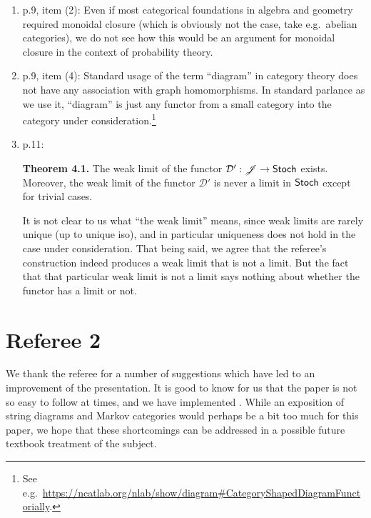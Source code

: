 \documentclass[11pt]{article}
\begin{document}
\begin{enumerate}[resume,label=(\alph*).]
	\item p.9, item (2): Even if most categorical foundations in algebra and geometry required monoidal closure (which is obviously not the case, take e.g.~abelian categories), we do not see how this would be an argument for monoidal closure in the context of probability theory.
	\item p.9, item (4): Standard usage of the term ``diagram'' in category theory does not have any association with graph homomorphisms. In standard parlance as we use it, ``diagram'' is just any functor from a small category into the category under consideration.\footnote{See e.g.~\href{https://ncatlab.org/nlab/show/diagram\#CategoryShapedDiagramFunctorially}{https://ncatlab.org/nlab/show/diagram\#CategoryShapedDiagramFunctorially}.}
	\item p.11:
		\begin{displayquote}
			\textbf{Theorem 4.1.} The weak limit of the functor $\mathcal{D}' : \mathscr{J} \to \operatorname{\mathsf{Stoch}}$ exists. Moreover, the weak limit of the functor $\mathcal{D}'$ is never a limit in $\operatorname{\mathsf{Stoch}}$ except for trivial cases.
		\end{displayquote}
		It is not clear to us what ``the weak limit'' means, since weak limits are rarely unique (up to unique iso), and in particular uniqueness does not hold in the case under consideration. That being said, we agree that the referee's construction indeed produces a weak limit that is not a limit. But the fact that that particular weak limit is not a limit says nothing about whether the functor has a limit or not.
\end{enumerate}

\section*{Referee 2}

We thank the referee for a number of suggestions which have led to an improvement of the presentation. It is good to know for us that the paper is not so easy to follow at times, and we have implemented . While an exposition of string diagrams and Markov categories would perhaps be a bit too much for this paper, we hope that these shortcomings can be addressed in a possible future textbook treatment of the subject.

%
%
\end{document}
